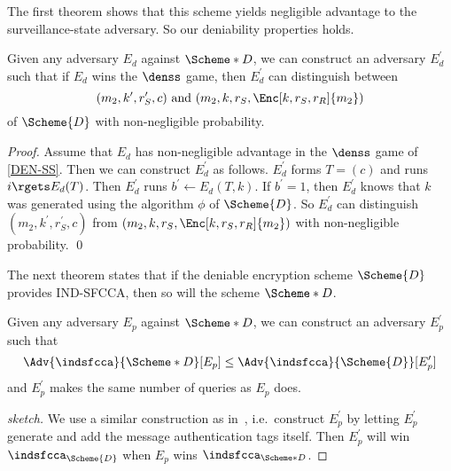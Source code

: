 The first theorem shows that this scheme yields negligible advantage to the 
surveillance-state adversary.
So our deniability properties holds.

\begin{theorem}
  Given any adversary \(E_d\) against \(\Scheme*{D}\), we can construct an 
  adversary \(E_d^\prime\) such that if \(E_d\) wins the \(\denss\) game, then 
  \(E_d^\prime\) can distinguish between \[
    ( m_2, k^\prime, r_S^\prime, c ) \text{ and }
    ( m_2, k, r_S, \Enc[k, r_S, r_R]{ m_2 } )
  \] of \(\Scheme{D}\) with non-negligible probability.
\end{theorem}
\begin{proof}
  Assume that \(E_d\) has non-negligible advantage in the \(\denss\) game of 
  \cref{DEN-SS}.
  Then we can construct \(E_d^\prime\) as follows.
  \(E_d^\prime\) forms \(T = ( c )\) and runs \(i\rgets E_d( T )\).
  Then \(E_d^\prime\) runs \(b^\prime\gets E_d( T, k )\).
  If \(b^\prime = 1\), then \(E_d^\prime\) knows that \(k\) was generated using 
  the algorithm \(\phi\) of \(\Scheme{D}\).
  So \(E_d^\prime\) can distinguish \(( m_2, k^\prime, r_S^\prime, c )\) from 
  \(( m_2, k, r_S, \Enc[k, r_S, r_R]{ m_2 } )\) with non-negligible 
  probability.
  \qed{}
\end{proof}

The next theorem states that if the deniable encryption scheme \(\Scheme{D}\) 
provides \ac{IND-SFCCA}, then so will the scheme \(\Scheme*{D}\).

\begin{theorem}
  Given any adversary \(E_p\) against \(\Scheme*{D}\), we can construct an 
  adversary \(E_p^\prime\) such that
  \begin{equation}
    \Adv{\indsfcca}{\Scheme*{D}}[E_p]
      \leq \Adv{\indsfcca}{\Scheme{D}}[E_p^\prime]
  \end{equation}
  and \(E_p^\prime\) makes the same number of queries as \(E_p\) does.
\end{theorem}
\begin{proof}[sketch]
  We use a similar construction as in~\cite{AuthEncryption,StatefulDecryption}, 
  i.e.\ construct \(E_p^\prime\) by letting \(E_p^\prime\) generate and add the 
  message authentication tags itself.
  Then \(E_p^\prime\) will win \(\indsfcca_{\Scheme{D}}\) when \(E_p\) wins 
  \(\indsfcca_{\Scheme*{D}}\).
\end{proof}


